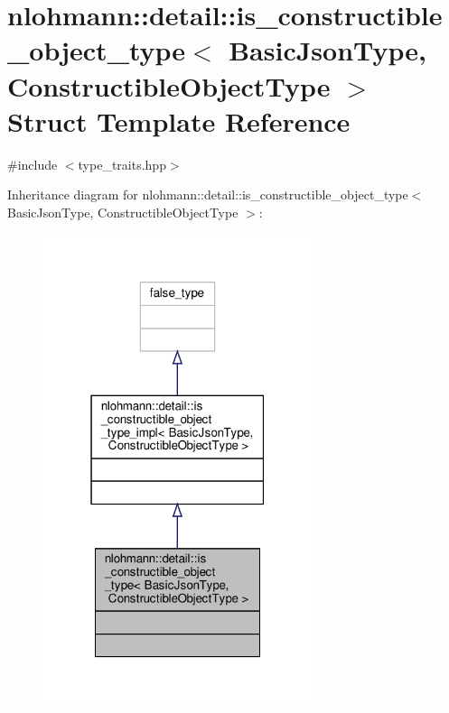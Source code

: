\hypertarget{structnlohmann_1_1detail_1_1is__constructible__object__type}{}\section{nlohmann\+:\+:detail\+:\+:is\+\_\+constructible\+\_\+object\+\_\+type$<$ Basic\+Json\+Type, Constructible\+Object\+Type $>$ Struct Template Reference}
\label{structnlohmann_1_1detail_1_1is__constructible__object__type}


{\ttfamily \#include $<$type\+\_\+traits.\+hpp$>$}



Inheritance diagram for nlohmann\+:\+:detail\+:\+:is\+\_\+constructible\+\_\+object\+\_\+type$<$ Basic\+Json\+Type, Constructible\+Object\+Type $>$\+:\nopagebreak
\begin{figure}[H]
\begin{center}
\leavevmode
\includegraphics[width=223pt]{structnlohmann_1_1detail_1_1is__constructible__object__type__inherit__graph}
\end{center}
\end{figure}


